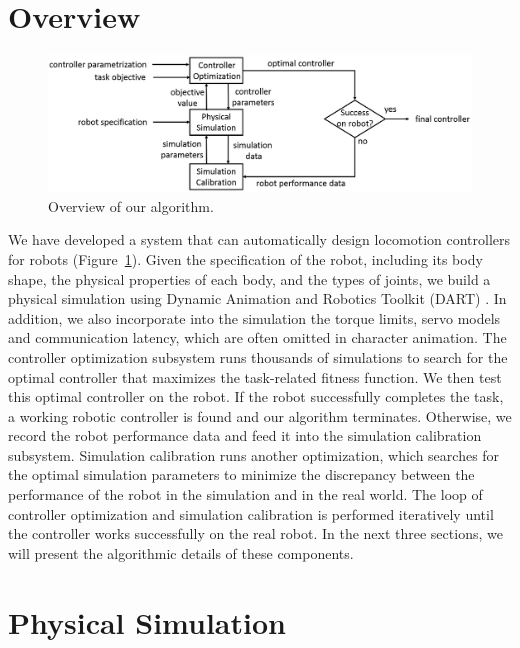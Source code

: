 \section{Overview}

\begin{figure}[!t]
  \centering
  \includegraphics[width=6in]{figures/controllerTransfer}
  \caption{Overview of our algorithm.}
  \label{fig:controllerTransferOverview}
\end{figure}

We have developed a system that can automatically design locomotion controllers for robots (Figure~\ref{fig:controllerTransferOverview}). Given the specification of the robot, including its body shape, the physical properties of each body, and the types of joints, we build a physical simulation using Dynamic Animation and Robotics Toolkit (DART) \cite{dart:2012}. In addition, we also incorporate into the simulation the torque limits, servo models and communication latency, which are often omitted in character animation. The controller optimization subsystem runs thousands of simulations to search for the optimal controller that maximizes the task-related fitness function. We then test this optimal controller on the robot. If the robot successfully completes the task, a working robotic controller is found and our algorithm terminates. Otherwise, we record the robot performance data and feed it into the simulation calibration subsystem. Simulation calibration runs another optimization, which searches for the optimal simulation parameters to minimize the discrepancy between the performance of the robot in the simulation and in the real world. The loop of controller optimization and simulation calibration is performed iteratively until the controller works successfully on the real robot. In the next three sections, we will present the algorithmic details of these components.

\section{Physical Simulation}

